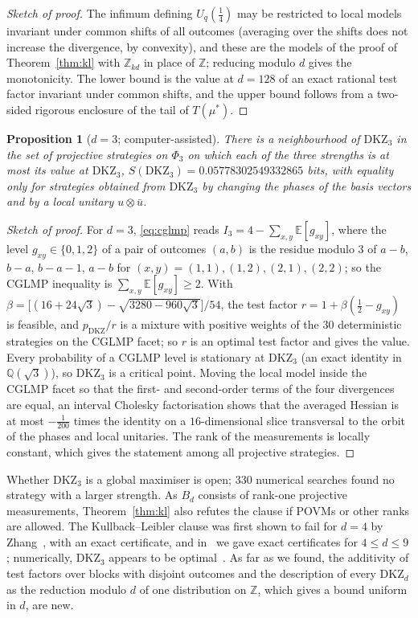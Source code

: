 \documentclass[11pt]{amsart}
\newtheorem{proposition}[theorem]{Proposition}
\theoremstyle{definition}
\theoremstyle{remark}
\numberwithin{equation}{section}
\newcommand{\Z}{\mathbb{Z}}
\newcommand{\E}{\mathbb{E}}
\newcommand{\Q}{\mathbb{Q}}
\newcommand{\DKZ}{\mathrm{DKZ}}
\begin{document}
\begin{proof}[Sketch of proof]
The infimum defining $U_q(\frac14)$ may be restricted to local models invariant under common shifts of all outcomes
(averaging over the shifts does not increase the divergence, by convexity), and these are the models of the proof of
Theorem~\ref{thm:kl} with $\Z_{kd}$ in place of $\Z$; reducing modulo $d$ gives the monotonicity. The lower bound is the
value at $d=128$ of an exact rational test factor invariant under common shifts, and the upper bound follows from a
two-sided rigorous enclosure of the tail of $T(\mu^*)$.
\end{proof}

\begin{proposition}[$d=3$; computer-assisted]\label{prop:kl3}
There is a neighbourhood of $\DKZ_3$ in the set of projective strategies on $\Phi_3$ on which each of the three
strengths is at most its value at $\DKZ_3$, $S(\DKZ_3)=0.05778302549332865$ bits, with equality only for strategies obtained
from $\DKZ_3$ by changing the phases of the basis vectors and by a local unitary $u\otimes\bar u$.
\end{proposition}

\begin{proof}[Sketch of proof]
For $d=3$, \eqref{eq:cglmp} reads $I_3=4-\sum_{x,y}\E[g_{xy}]$, where the level $g_{xy}\in\{0,1,2\}$ of a pair of
outcomes $(a,b)$ is the residue modulo $3$ of $a-b$, $b-a$, $b-a-1$, $a-b$ for $(x,y)=(1,1),(1,2),(2,1),(2,2)$; so the
CGLMP inequality is $\sum_{x,y}\E[g_{xy}]\ge2$. With
$\beta=\bigl[(16+24\sqrt3)-\sqrt{3280-960\sqrt3}\bigr]/54$, the test factor $r=1+\beta(\frac12-g_{xy})$ is feasible, and
$p_{\DKZ}/r$ is a mixture with positive weights of the $30$ deterministic strategies on the CGLMP facet; so $r$ is an
optimal test factor and gives the value. Every probability of a CGLMP level is stationary at $\DKZ_3$ (an exact
identity in $\Q(\sqrt3)$), so $\DKZ_3$ is a critical point. Moving the local model inside the CGLMP facet so that the
first- and second-order terms of the four divergences are equal, an interval Cholesky factorisation shows that the
averaged Hessian is at most $-\frac1{200}$ times the identity on a $16$-dimensional slice transversal to the orbit of
the phases and local unitaries. The rank of the measurements is locally constant, which gives the statement among all
projective strategies.
\end{proof}

Whether $\DKZ_3$ is a global maximiser is open; $330$ numerical searches found no strategy with a larger strength. As
$B_d$ consists of rank-one projective measurements, Theorem~\ref{thm:kl} also refutes the clause if POVMs or other ranks
are allowed. The Kullback--Leibler clause was first shown to fail for $d=4$ by Zhang~\cite{Zhang}, with an exact
certificate, and in~\cite{repo-cglmp} we gave exact certificates for $4\le d\le9$; numerically, $\DKZ_3$ appears to be
optimal~\cite{vDGG,AGG}. As far as we found, the additivity of test factors over blocks with disjoint outcomes and the
description of every $\DKZ_d$ as the reduction modulo $d$ of one distribution on $\Z$, which gives a bound uniform in
$d$, are new.
\end{document}
